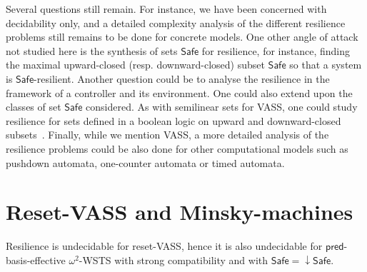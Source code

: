 \documentclass[runningheads]{llncs}
\newcommand{\alain}[1]{\todo[inline,color=red!20]{{\bf AF:} #1}}
\newcommand{\pred}{\textsf{pred}}
\newcommand{\Safe}{\textsf{Safe}}
\begin{document}
Several questions still remain.
For instance, we have been concerned with decidability only, and a detailed complexity analysis of the different resilience problems still remains to be done for concrete models. 
One other angle of attack not studied here is the synthesis of sets 
$\Safe$ for resilience,
for instance, 
 finding the maximal upward-closed (resp. downward-closed) subset 
$\Safe$ so that a system is $\Safe$-resilient. 
Another question could be to analyse the resilience in the framework of a controller and its environment. 
One could also extend upon the classes of set $\Safe$ 
 considered. As with semilinear sets for VASS, one could study resilience for sets defined in a boolean logic on upward and downward-closed subsets~\cite{DBLP:journals/fmsd/BertrandS13}. Finally, while we mention VASS, a more detailed analysis of the resilience problems could be also done for other computational models such as pushdown automata, one-counter automata or timed automata.


\alain{remercier les reviewers !}




\appendix




\section{Reset-VASS and Minsky-machines}\label{minsk}



\begin{proposition}\label{indec WSTS with dcs}
{\sc Resilience} is undecidable for reset-VASS, hence it is also undecidable for $\pred$-basis-effective $\omega^2$-WSTS with strong compatibility and with 
$\Safe=\mathop{\downarrow} \Safe$.
\end{proposition}
\end{document}
